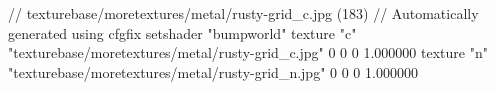 // texturebase/moretextures/metal/rusty-grid_c.jpg (183)
// Automatically generated using cfgfix
setshader "bumpworld"
texture "c" "texturebase/moretextures/metal/rusty-grid_c.jpg" 0 0 0 1.000000
texture "n" "texturebase/moretextures/metal/rusty-grid_n.jpg" 0 0 0 1.000000
